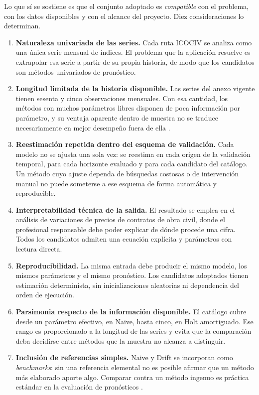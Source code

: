 \documentclass[12pt,letterpaper]{article}
\providecommand{\parencite}{\citep}
\newcommand{\ICOCIV}{ICOCIV}
\begin{document}
Lo que sí se sostiene es que el conjunto adoptado es \emph{compatible} con el problema, con los datos disponibles y con el alcance del proyecto. Diez consideraciones lo determinan.

\begin{enumerate}[leftmargin=*,label=\textbf{\arabic*.}]
    \item \textbf{Naturaleza univariada de las series.} Cada ruta \ICOCIV{} se analiza como una única serie mensual de índices. El problema que la aplicación resuelve es extrapolar esa serie a partir de su propia historia, de modo que los candidatos son métodos univariados de pronóstico.
    \item \textbf{Longitud limitada de la historia disponible.} Las series del anexo vigente tienen sesenta y cinco observaciones mensuales. Con esa cantidad, los métodos con muchos parámetros libres disponen de poca información por parámetro, y su ventaja aparente dentro de muestra no se traduce necesariamente en mejor desempeño fuera de ella \parencite{hyndman2021fpp3}.
    \item \textbf{Reestimación repetida dentro del esquema de validación.} Cada modelo no se ajusta una sola vez: se reestima en cada origen de la validación temporal, para cada horizonte evaluado y para cada candidato del catálogo. Un método cuyo ajuste dependa de búsquedas costosas o de intervención manual no puede someterse a ese esquema de forma automática y reproducible.
    \item \textbf{Interpretabilidad técnica de la salida.} El resultado se emplea en el análisis de variaciones de precios de contratos de obra civil, donde el profesional responsable debe poder explicar de dónde procede una cifra. Todos los candidatos admiten una ecuación explícita y parámetros con lectura directa.
    \item \textbf{Reproducibilidad.} La misma entrada debe producir el mismo modelo, los mismos parámetros y el mismo pronóstico. Los candidatos adoptados tienen estimación determinista, sin inicializaciones aleatorias ni dependencia del orden de ejecución.
    \item \textbf{Parsimonia respecto de la información disponible.} El catálogo cubre desde un parámetro efectivo, en Naive, hasta cinco, en Holt amortiguado. Ese rango es proporcionado a la longitud de las series y evita que la comparación deba decidirse entre métodos que la muestra no alcanza a distinguir.
    \item \textbf{Inclusión de referencias simples.} Naive y Drift se incorporan como \emph{benchmarks}: sin una referencia elemental no es posible afirmar que un método más elaborado aporte algo. Comparar contra un método ingenuo es práctica estándar en la evaluación de pronósticos \parencite{hyndman_koehler2006}.

\end{enumerate}
\end{document}
